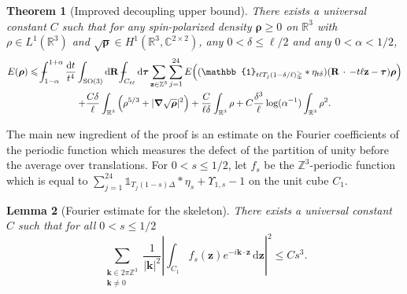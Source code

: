 \documentclass[final,reqno]{amsart}
\newtheorem{theorem}{Theorem}[section]
\newtheorem{lemma}[theorem]{Lemma}
\theoremstyle{remark}
\renewcommand{\le}{\leqslant}
\renewcommand{\ge}{\geqslant}
\newcommand{\RR}{\mathbb{R}}
\newcommand{\CC}{\mathbb{C}}
\newcommand{\ZZ}{\mathbb{Z}}
\newcommand{\SO}{\mathrm{SO}}
\newcommand{\iden}{\mathbb{1}}
\newcommand{\grad}{\bm{\nabla}}
\newcommand{\tetra}{\mathbb{\Delta}}
\newcommand{\dd}{\mathrm{d}}
\def\Xint#1{\mathchoice
{\XXint\displaystyle\textstyle{#1}}
{\XXint\textstyle\scriptstyle{#1}}
{\XXint\scriptstyle\scriptscriptstyle{#1}}
{\XXint\scriptscriptstyle\scriptscriptstyle{#1}}
\!\int}
\def\XXint#1#2#3{{\setbox0=\hbox{$#1{#2#3}{\int}$ }
\vcenter{\hbox{$#2#3$ }}\kern-.6\wd0}}
\def\dashint{\Xint-}
\begin{document}
\begin{theorem}[Improved decoupling upper bound]\label{prop:upper_bound}
There exists a universal constant $C$ such that for any spin-polarized density $\bm{\rho}\ge0$ on $\RR^3$ with $\rho\in L^1(\RR^3)$ and $\sqrt{\bm{\rho}}\in H^1(\RR^3,\CC^{2\times2})$, any $0<\delta\le\ell/2$ and any $0<\alpha<1/2$,
\begin{multline}\label{eq:upper_bound_average}
 E(\bm{\rho})\le
  \dashint_{1-\alpha}^{1+\alpha}\frac{\dd t}{t^4}\int_{\SO(3)}\dd \mathbf{R}\,\dashint_{C_{t\ell}}\dd\bm{\tau}\sum_{\mathbf{z}\in\ZZ^3}\sum_{j=1}^{24} E\Big((\iden_{t\ell T_j(1-\delta/\ell)\tetra}\ast\eta_{t\delta})(\mathbf{R}\,\cdot\,-t\ell \mathbf{z}-\bm{\tau})\bm{\rho}\Big)\\
 +\frac{C\delta}{\ell}\int_{\RR^3}\Big(\rho^{5/3}+|\grad\sqrt{\bm{\rho}}|^2\Big)+\frac{C}{\ell\delta}\int_{\RR^3}\rho+C\frac{\delta^3}{\ell}\log(\alpha^{-1})\int_{\RR^3}\rho^2.
\end{multline}
\end{theorem}

The main new ingredient of the proof is an estimate on the Fourier coefficients of the periodic function which measures the defect of the partition of unity before the average over translations. For $0<s\le1/2$, let $f_s$ be the $\ZZ^3$-periodic function which is equal to $\sum_{j=1}^{24}\iden_{T_j(1-s)\tetra}\ast\eta_s+\Upsilon_{1,s}-1$ on the unit cube $C_1$.

\begin{lemma}[Fourier estimate for the skeleton]\label{lem:Fourier_skeleton}
There exists a universal constant $C$ such that for all $0<s\le1/2$
\begin{equation}\label{eq:Fourier_skeleton}
\sum_{\substack{\mathbf{k}\in 2\pi\ZZ^3\\ \mathbf{k}\neq0}}\frac{1}{|\mathbf{k}|^2}\left|\int_{C_1}f_{s}(\mathbf{z})e^{-i\mathbf{k}\cdot \mathbf{z}}\,\dd \mathbf{z}\right|^2\le Cs^3.
\end{equation}
\end{lemma}
\end{document}
